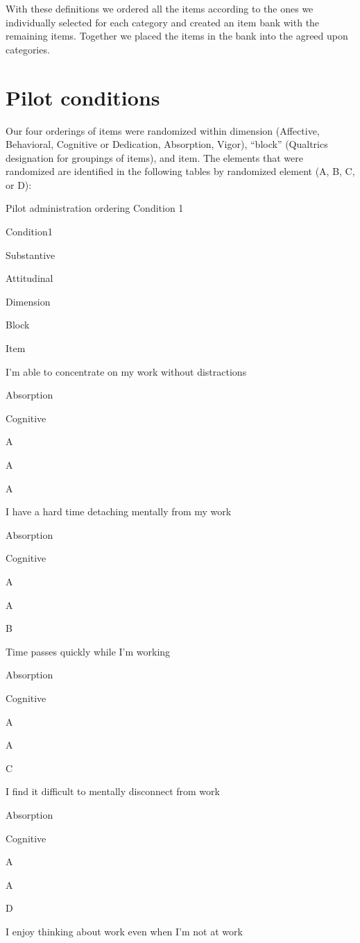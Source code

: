 \documentclass[
]{book}
\begin{document}
With these definitions we ordered all the items according to the ones we individually selected for each category and created an item bank with the remaining items. Together we placed the items in the bank into the agreed upon categories.

\hypertarget{pilot2}{%
\chapter{Pilot conditions}\label{pilot2}}

Our four orderings of items were randomized within dimension (Affective, Behavioral, Cognitive or Dedication, Absorption, Vigor), ``block'' (Qualtrics designation for groupings of items), and item. The elements that were randomized are identified in the following tables by randomized element (A, B, C, or D):

\label{tab:conditions}Pilot administration ordering Condition 1

Condition1

Substantive

Attitudinal

Dimension

Block

Item

I'm able to concentrate on my work without distractions

Absorption

Cognitive

A

A

A

I have a hard time detaching mentally from my work

Absorption

Cognitive

A

A

B

Time passes quickly while I'm working

Absorption

Cognitive

A

A

C

I find it difficult to mentally disconnect from work

Absorption

Cognitive

A

A

D

I enjoy thinking about work even when I'm not at work
\end{document}
